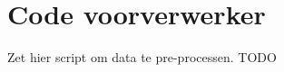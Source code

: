 \chapter{Code voorverwerker}
\label{app:voorverwerker}

Zet hier script om data te pre-processen. TODO